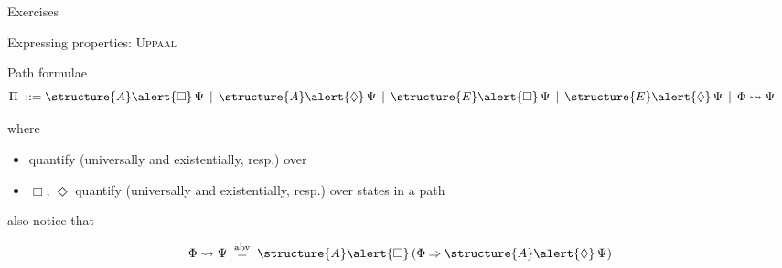 \documentclass[aspectratio=169]{beamer}
\begin{document}
\begin{slide}{Exercises}
  \centering

  
\end{slide}

\begin{slide}{Expressing properties: \textsc{Uppaal}}
\small

\newcommand{\Boxc}{\alert{\Box}}
\newcommand{\Diamondc}{\alert{\Diamond}}
\newcommand{\Ac}{\structure{A}}
\newcommand{\Ec}{\structure{E}}

\begin{block}{Path formulae}
\begin{align*}
\Pi\; ::=\; & \Ac \Boxc\, \Psi\, \mid\, \Ac\Diamondc\, \Psi\, \mid\, \Ec \Boxc\, \Psi\, \mid\, \Ec \Diamondc\, \Psi\, \mid\, \Phi \leadsto  \Psi\
\end{align*}

where
\begin{itemize}
\item {} quantify (universally and existentially, resp.) over 
\item \alert{$\Box$, $\Diamond$} quantify (universally and existentially, resp.) over \alert{states in a path}
\end{itemize}
also notice that

\vspace*{-3mm}
\begin{align*}
 \Phi \leadsto  \Psi\; \abv\; \Ac \Boxc\, (\Phi \imp \Ac \Diamondc\, \Psi)
\end{align*}
\end{block}

\end{slide}
\end{document}
